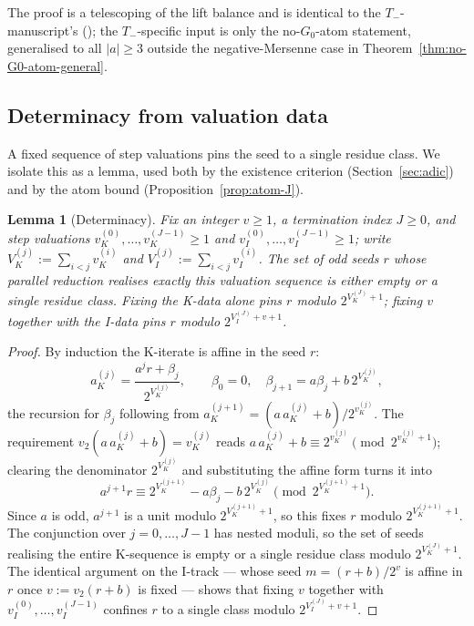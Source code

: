 \documentclass[11pt,reqno]{amsart}
\theoremstyle{plain}
\newtheorem{lemma}[theorem]{Lemma}
\theoremstyle{definition}
\theoremstyle{remark}
\newcommand{\Tneg}{T_{-}}
\newcommand{\Vk}{V_{K}}
\newcommand{\Vi}{V_{I}}
\newcommand{\vk}{v_{K}}
\newcommand{\vi}{v_{I}}
\newcommand{\vtwo}{v_{2}}
\begin{document}
The proof is a telescoping of the lift balance and is identical to the
$\Tneg$-manuscript's (\cite[Section~6.3]{ObstructionResidues2026}); the
$\Tneg$-specific input is only the no-$G_0$-atom statement, generalised
to all $\lvert a \rvert \ge 3$ outside the negative-Mersenne case in
Theorem~\ref{thm:no-G0-atom-general}.

\subsection{Determinacy from valuation data}

A fixed sequence of step valuations pins the seed to a single residue
class. We isolate this as a lemma, used both by the existence criterion
(Section~\ref{sec:adic}) and by the atom bound
(Proposition~\ref{prop:atom-J}).

\begin{lemma}[Determinacy]\label{lem:determinacy}
Fix an integer $v \ge 1$, a termination index $J \ge 0$, and step
valuations $\vk^{(0)}, \ldots, \vk^{(J-1)} \ge 1$ and
$\vi^{(0)}, \ldots, \vi^{(J-1)} \ge 1$; write
$\Vk^{(j)} := \sum_{i<j}\vk^{(i)}$ and $\Vi^{(j)} := \sum_{i<j}\vi^{(i)}$.
The set of odd seeds $r$ whose parallel reduction realises exactly this
valuation sequence is either empty or a single residue class. Fixing the
K-data alone pins $r$ modulo $2^{\Vk^{(J)}+1}$; fixing $v$ together with the
I-data pins $r$ modulo $2^{\Vi^{(J)}+v+1}$.
\end{lemma}

\begin{proof}
By induction the K-iterate is affine in the seed $r$:
\[
a_K^{(j)} = \frac{a^j r + \beta_j}{2^{\Vk^{(j)}}}, \qquad
\beta_0 = 0, \quad \beta_{j+1} = a\beta_j + b\,2^{\Vk^{(j)}},
\]
the recursion for $\beta_j$ following from
$a_K^{(j+1)} = (a\,a_K^{(j)} + b)/2^{\vk^{(j)}}$. The requirement
$\vtwo(a\,a_K^{(j)} + b) = \vk^{(j)}$ reads
$a\,a_K^{(j)} + b \equiv 2^{\vk^{(j)}} \pmod{2^{\vk^{(j)}+1}}$; clearing the
denominator $2^{\Vk^{(j)}}$ and substituting the affine form turns it into
\[
a^{j+1} r \equiv 2^{\Vk^{(j+1)}} - a\beta_j - b\,2^{\Vk^{(j)}}
            \pmod{2^{\Vk^{(j+1)}+1}}.
\]
Since $a$ is odd, $a^{j+1}$ is a unit modulo $2^{\Vk^{(j+1)}+1}$, so this
fixes $r$ modulo $2^{\Vk^{(j+1)}+1}$. The conjunction over
$j = 0, \ldots, J-1$ has nested moduli, so the set of seeds realising the
entire K-sequence is empty or a single residue class modulo
$2^{\Vk^{(J)}+1}$. The identical argument on the I-track --- whose seed
$m = (r+b)/2^v$ is affine in $r$ once $v := \vtwo(r+b)$ is fixed --- shows
that fixing $v$ together with $\vi^{(0)}, \ldots, \vi^{(J-1)}$ confines $r$
to a single class modulo $2^{\Vi^{(J)}+v+1}$. \qedhere
\end{proof}
\end{document}
